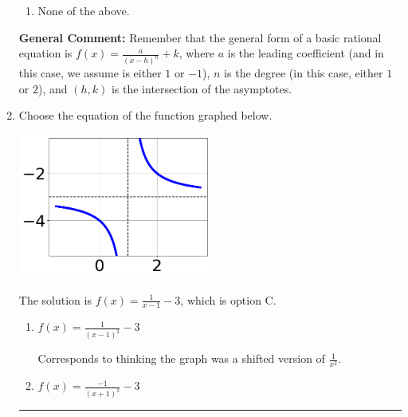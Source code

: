 \documentclass{extbook}[14pt]
\newcommand{\litem}[1]{\item #1

\rule{\textwidth}{0.4pt}}
\begin{document}
\begin{enumerate}
{\begin{enumerate}[label=\Alph*.]
\item None of the above.\end{enumerate}
\textbf{General Comment:} Remember that the general form of a basic rational equation is $ f(x) = \frac{a}{(x-h)^n} + k$, where $a$ is the leading coefficient (and in this case, we assume is either $1$ or $-1$), $n$ is the degree (in this case, either $1$ or $2$), and $(h, k)$ is the intersection of the asymptotes.
}
\litem{
Choose the equation of the function graphed below.

\begin{center}
    \includegraphics[width=0.5\textwidth]{../Figures/rationalGraphToEquationB.png}
\end{center}


The solution is \( f(x) = \frac{1}{x - 1} - 3 \), which is option C.\begin{enumerate}[label=\Alph*.]
\item \( f(x) = \frac{1}{(x - 1)^2} - 3 \)

Corresponds to thinking the graph was a shifted version of $\frac{1}{x^2}$.
\item \( f(x) = \frac{-1}{(x + 1)^2} - 3 \)


\end{enumerate}}
\end{enumerate}
\end{document}

